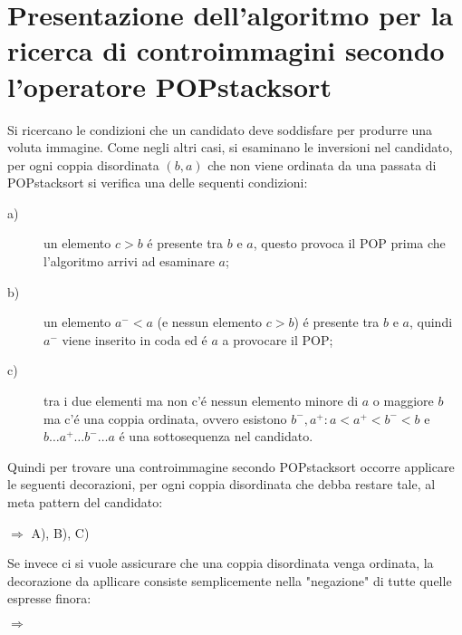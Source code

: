 \section*{Presentazione  dell'algoritmo per la ricerca di controimmagini secondo l'operatore POPstacksort}
Si ricercano le condizioni che un candidato deve soddisfare per produrre una voluta immagine. Come negli altri casi, si esaminano le inversioni nel candidato, per ogni coppia disordinata $(b,a)$ che non viene ordinata da una passata di POPstacksort si verifica una delle sequenti condizioni:
\begin{description}
	\item[a)] un elemento $c>b$ \'e presente tra $b$ e $a$, questo provoca il POP prima che l'algoritmo arrivi ad esaminare $a$;
	\item[b)] un elemento $a^-<a$ (e nessun elemento $c>b$) \'e presente tra $b$ e $a$, quindi $a^-$ viene inserito in coda ed \'e $a$ a provocare il POP;
	\item[c)] tra i due elementi ma non c'\'e nessun elemento minore di $a$ o maggiore $b$ ma c'\'e una coppia ordinata, ovvero esistono ${b^-,a^+}:a<a^+<b^-<b$ e $b\dots{a^+}\dots{b^-}\dots{a}$ \'e una sottosequenza nel candidato.
\end{description}
Quindi per trovare una controimmagine secondo POPstacksort occorre applicare le seguenti decorazioni, per ogni coppia disordinata che debba restare tale, al meta pattern del candidato:
\begin{center}
$\Rightarrow$
A),
B),
C)
\end{center}
Se invece ci si vuole assicurare che una coppia disordinata venga ordinata, la decorazione da apllicare consiste semplicemente nella "negazione" di tutte quelle espresse finora:
\begin{center}
$\Rightarrow$
\end{center}
